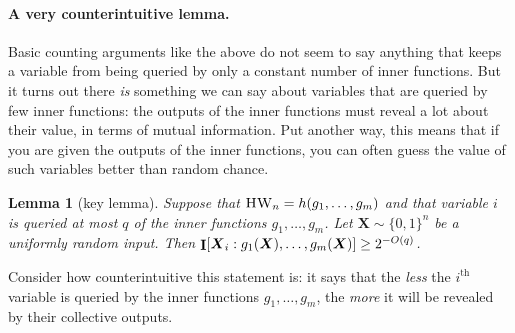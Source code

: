 \documentclass[10pt,a4paper]{article}
\newtheorem{lemma}{Lemma}[section]
\theoremstyle{definition}
\theoremstyle{remark}
\renewcommand{\th}{^{\mathrm{th}}}
\newcommand{\mathsc}[1]{{\normalfont\textsc{#1}}}
\DeclarePairedDelimiter{\sqb}{[}{]}
\DeclareMathOperator{\I}{\mathbf{I}}
\DeclareMathOperator{\HW}{\mathsc{HW}}
\newcommand{\bX}{\boldsymbol{X}}
\begin{document}
\paragraph*{A very counterintuitive lemma.}
Basic counting arguments like the above do not seem to say anything that keeps a variable from being queried by only a constant number of inner functions.
But it turns out there \emph{is} something we can say about variables that are queried by few inner functions: the outputs of the inner functions must reveal a lot about their value, in terms of mutual information.
Put another way, this means that if you are given the outputs of the inner functions, you can often guess the value of such variables better than random chance.

\begin{lemma}[key lemma]
\label{lemma:main}
Suppose that $\HW_n = h(g_1, \ldots, g_m)$ and that variable $i$ is queried at most $q$ of the inner functions $g_1, \ldots, g_m$.
Let $\bX \sim \{0,1\}^n$ be a uniformly random input.
Then $\I\sqb{\bX_i:g_1(\bX), \ldots, g_m(\bX)} \geq 2^{-O(q)}$.
\end{lemma}

Consider how counterintuitive this statement is: it says that the \emph{less} the $i\th$ variable is queried by the inner functions $g_1, 
\ldots, g_m$, the \emph{more} it will be revealed by their collective outputs.
\end{document}
